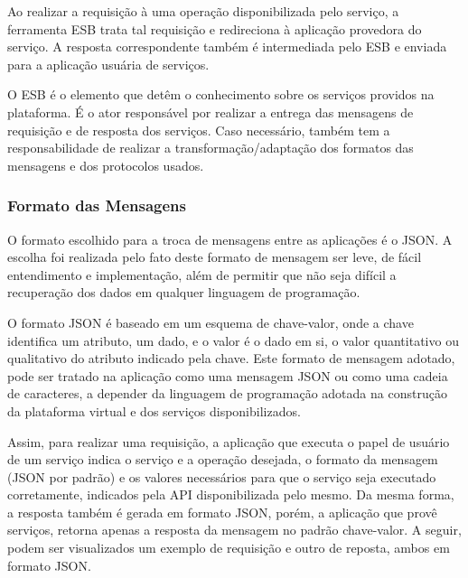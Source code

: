 Ao realizar a requisição à uma operação disponibilizada pelo serviço, a ferramenta ESB trata tal requisição e redireciona à aplicação provedora do serviço. A resposta correspondente também é intermediada pelo ESB e enviada para a aplicação usuária de serviços.

O ESB é o elemento que detêm o conhecimento sobre os serviços providos na plataforma. É o ator responsável por realizar a entrega das mensagens de requisição e de resposta dos serviços. Caso necessário, também tem a  responsabilidade de realizar a transformação/adaptação dos formatos das mensagens e dos protocolos usados.

\subsubsection{Formato das Mensagens}
O formato escolhido para a troca de mensagens entre as aplicações é o JSON. A escolha foi realizada pelo fato deste formato de mensagem ser leve, de fácil entendimento e implementação, além de permitir que não seja difícil a recuperação dos dados em qualquer linguagem de programação.

O formato JSON é baseado em um esquema de chave-valor, onde a chave identifica um atributo, um dado, e o valor é o dado em si, o valor quantitativo ou qualitativo do atributo indicado pela chave. Este formato de mensagem adotado, pode ser tratado na aplicação como uma mensagem JSON ou como uma cadeia de caracteres, a depender da linguagem de programação adotada na construção da plataforma virtual e dos serviços disponibilizados.

Assim, para realizar uma requisição, a aplicação que executa o papel de usuário de um serviço indica o serviço e a operação desejada, o formato da mensagem (JSON por padrão) e os valores necessários para que o serviço seja executado corretamente, indicados pela API disponibilizada pelo mesmo. Da mesma forma, a resposta também é gerada em formato JSON, porém, a aplicação que provê serviços, retorna apenas a resposta da mensagem no padrão chave-valor. A seguir, podem ser visualizados um exemplo de requisição e outro de reposta, ambos em formato JSON.


